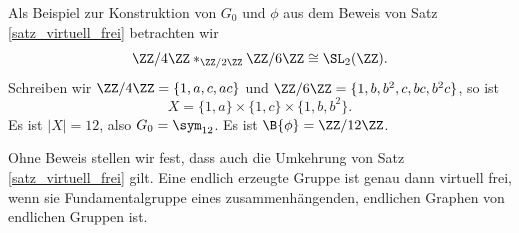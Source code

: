 \BSP Als Beispiel zur Konstruktion von $G_0$ und $\phi$ aus
dem Beweis von Satz \ref{satz_virtuell_frei} betrachten wir
\[
\ZZ/4\ZZ *_{\ZZ/2\ZZ} \ZZ/6\ZZ \cong \SL_2(\ZZ).
\]
Schreiben wir $\ZZ/4\ZZ=\{1,a,c,ac\}$ und
$\ZZ/6\ZZ=\{1,b,b^2,c,bc,b^2c\}$, so ist
\[
X = \{1,a\} \times \{1,c\} \times \{1,b,b^2\}.
\]
Es ist $|X|=12$, also $G_0=\sym_{12}$. Es ist $\B{\phi}=\ZZ/12\ZZ$.

Ohne Beweis stellen wir fest, dass auch die Umkehrung
von Satz \ref{satz_virtuell_frei} gilt.
\SATZ Eine endlich erzeugte Gruppe ist genau dann virtuell frei,
wenn sie Fundamentalgruppe eines zusammenhängenden, endlichen
Graphen von endlichen Gruppen ist.
